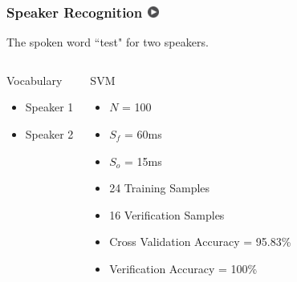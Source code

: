 \documentclass{beamer}
\begin{document}
\begin{frame}
\frametitle{Speaker Recognition 
\href{images/speaker.mp4}{\includegraphics[width=0.15in]{images/play.png}}}
The spoken word ``test" for two speakers.
\begin{columns}[c]
  \column{1.5in}
	\begin{block}{Vocabulary}
		\begin{itemize}
		\item Speaker 1
		\item Speaker 2
		\end{itemize}
	\end{block}
  \column{2.5in}
  	\begin{block}{SVM}
		\begin{itemize}
		\item $N$ = 100
		\item $S_f$ = 60ms
		\item $S_o$ = 15ms
		\item 24 Training Samples
		\item 16 Verification Samples
		\item \small{Cross Validation Accuracy = 95.83\%}
		\item Verification Accuracy = 100\%
		\end{itemize}
	\end{block}
\end{columns}
\end{frame}

\end{document}
